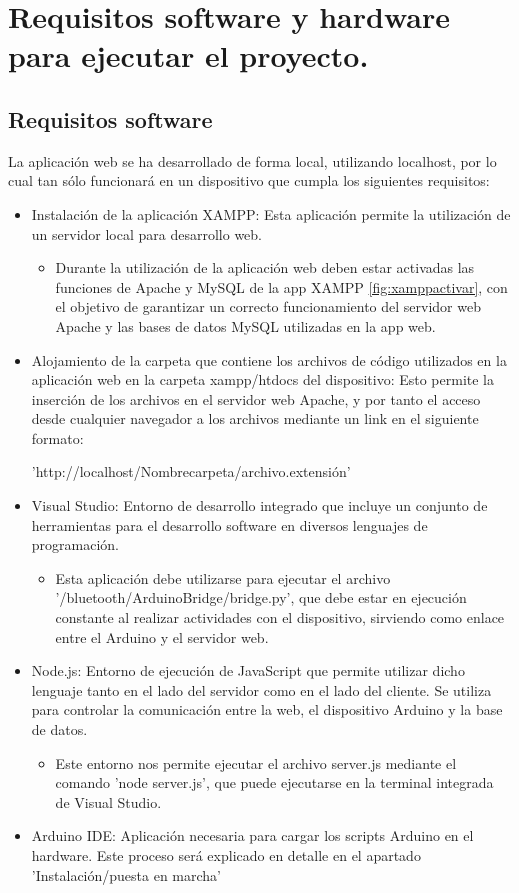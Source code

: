 
\section{Requisitos software y hardware para ejecutar el proyecto.}
\subsection{Requisitos software}
La aplicación web se ha desarrollado de forma local, utilizando localhost, por lo cual tan sólo funcionará en un dispositivo que cumpla los siguientes requisitos:
\begin{itemize}
    \item Instalación de la aplicación XAMPP: Esta aplicación permite la utilización de un servidor local para desarrollo web. 
    \begin{itemize}
        \item Durante la utilización de la aplicación web deben estar activadas las funciones de Apache y MySQL de la app XAMPP \ref{fig:xamppactivar}, con el objetivo de garantizar un correcto funcionamiento del servidor web Apache y las bases de datos MySQL utilizadas en la app web.
    \end{itemize}
    \item Alojamiento de la carpeta que contiene los archivos de código utilizados en la aplicación web en la carpeta xampp/htdocs del dispositivo: Esto permite la inserción de los archivos en el servidor web Apache, y por tanto el acceso desde cualquier navegador a los archivos mediante un link en el siguiente formato: 
    
    'http://localhost/Nombrecarpeta/archivo.extensión'
    \item Visual Studio: Entorno de desarrollo integrado que incluye un conjunto de herramientas para el desarrollo software en diversos lenguajes de programación.
    \begin{itemize}
        \item Esta aplicación debe utilizarse para ejecutar el archivo '/bluetooth/ArduinoBridge/bridge.py', que debe estar en ejecución constante al realizar actividades con el dispositivo, sirviendo como enlace entre el Arduino y el servidor web.
    \end{itemize}
    \item Node.js: Entorno de ejecución de JavaScript que permite utilizar dicho lenguaje tanto en el lado del servidor como en el lado del cliente. Se utiliza para controlar la comunicación entre la web, el dispositivo Arduino y la base de datos.
    \begin{itemize}
        \item Este entorno nos permite ejecutar el archivo server.js mediante el comando 'node server.js', que puede ejecutarse en la terminal integrada de Visual Studio.
    \end{itemize}
    \item Arduino IDE: Aplicación necesaria para cargar los scripts Arduino en el hardware. Este proceso será explicado en detalle en el apartado 'Instalación/puesta en marcha'
\end{itemize}
